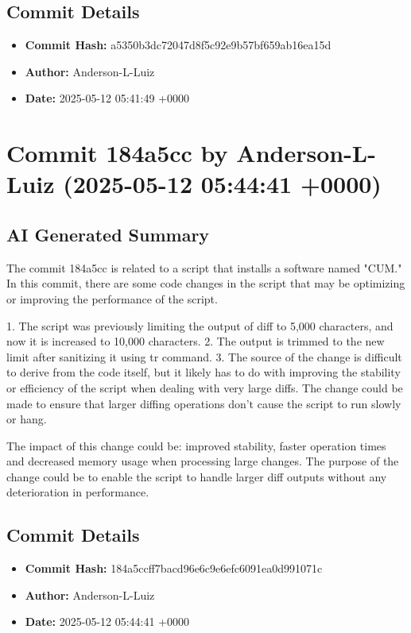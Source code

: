 \documentclass{article}
\begin{document}
\subsection{Commit Details}
\begin{itemize}
    \item \textbf{Commit Hash:} a5350b3dc72047d8f5c92e9b57bf659ab16ea15d
    \item \textbf{Author:} Anderson-L-Luiz
    \item \textbf{Date:} 2025-05-12 05:41:49 +0000
\end{itemize}
\hrulefill

\section{Commit 184a5cc by Anderson-L-Luiz (2025-05-12 05:44:41 +0000)}
\subsection{AI Generated Summary}
{\selectfont
 The commit 184a5cc is related to a script that installs a software named "CUM." In this commit, there are some code changes in the script that may be optimizing or improving the performance of the script.

1. The script was previously limiting the output of diff to 5,000 characters, and now it is increased to 10,000 characters.
2. The output is trimmed to the new limit after sanitizing it using tr command.
3. The source of the change is difficult to derive from the code itself, but it likely has to do with improving the stability or efficiency of the script when dealing with very large diffs. The change could be made to ensure that larger diffing operations don't cause the script to run slowly or hang.

The impact of this change could be: improved stability, faster operation times and decreased memory usage when processing large changes. The purpose of the change could be to enable the script to handle larger diff outputs without any deterioration in performance.
}
\subsection{Commit Details}
\begin{itemize}
    \item \textbf{Commit Hash:} 184a5ccff7bacd96e6c9e6efc6091ea0d991071c
    \item \textbf{Author:} Anderson-L-Luiz
    \item \textbf{Date:} 2025-05-12 05:44:41 +0000
\end{itemize}
\hrulefill
\end{document}
